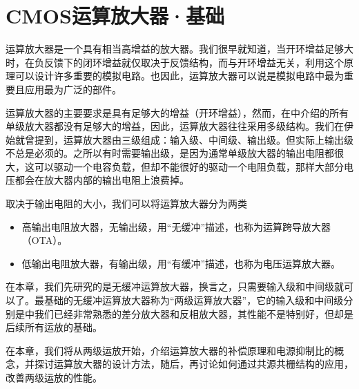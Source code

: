 \chapter{CMOS运算放大器·基础}
运算放大器是一个具有相当高增益的放大器。我们很早就知道，当开环增益足够大时，在负反馈下的闭环增益就仅取决于反馈结构，而与开环增益无关，利用这个原理可以设计许多重要的模拟电路。也因此，运算放大器可以说是模拟电路中最为重要且应用最为广泛的部件。

运算放大器的主要要求是具有足够大的增益（开环增益），然而，在中介绍的所有单级放大器都没有足够大的增益，因此，运算放大器往往采用多级结构。我们在伊始就曾提到，运算放大器由三级组成：输入级、中间级、输出级。但实际上输出级不总是必须的。之所以有时需要输出级，是因为通常单级放大器的输出电阻都很大，这可以驱动一个电容负载，但却不能很好的驱动一个电阻负载，那样大部分电压都会在放大器内部的输出电阻上浪费掉。

取决于输出电阻的大小，我们可以将运算放大器分为两类
\begin{itemize}
    \item 高输出电阻放大器，无输出级，用“无缓冲”描述，也称为运算跨导放大器（OTA）。
    \item 低输出电阻放大器，有输出级，用“有缓冲”描述，也称为电压运算放大器。
\end{itemize}
在本章，我们先研究的是无缓冲运算放大器，换言之，只需要输入级和中间级就可以了。最基础的无缓冲运算放大器称为“两级运算放大器”，它的输入级和中间级分别是中我们已经非常熟悉的差分放大器和反相放大器，其性能不是特别好，但却是后续所有运放的基础。

在本章，我们将从两级运放开始，介绍运算放大器的补偿原理和电源抑制比的概念，并探讨运算放大器的设计方法，随后，再讨论如何通过共源共栅结构的应用，改善两级运放的性能。




% 


